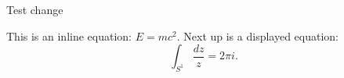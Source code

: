 \documentclass{article}
\begin{document}
Test change

This is an inline equation: $E = mc^2$. Next up is a displayed equation:
\[ \int_{S^1} \frac{dz}{z} = 2 \pi i. \]
\end{document}
